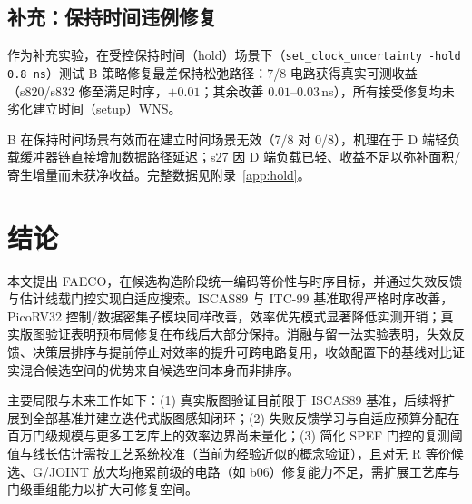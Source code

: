 \documentclass[journal]{IEEEtran}
\begin{document}
\subsection{补充：保持时间违例修复}\label{sec:hold}

作为补充实验，在受控保持时间（hold）场景下（\texttt{set\_clock\_uncertainty -hold 0.8\,ns}）测试 B 策略修复最差保持松弛路径：7/8 电路获得真实可测收益（s820/s832 修至满足时序，$+0.01$；其余改善 $0.01$--$0.03\,$ns），所有接受修复均未劣化建立时间（setup）WNS。

B 在保持时间场景有效而在建立时间场景无效（7/8 对 0/8），机理在于 D 端轻负载缓冲器链直接增加数据路径延迟；s27 因 D 端负载已轻、收益不足以弥补面积/寄生增量而未获净收益。完整数据见附录~\ref{app:hold}。

\section{结论}\label{sec:conclusion}

本文提出 FAECO，在候选构造阶段统一编码等价性与时序目标，并通过失效反馈与估计线载门控实现自适应搜索。ISCAS89 与 ITC-99 基准取得严格时序改善，PicoRV32 控制/数据密集子模块同样改善，效率优先模式显著降低实测开销；真实版图验证表明预布局修复在布线后大部分保持。消融与留一法实验表明，失效反馈、决策层排序与提前停止对效率的提升可跨电路复用，收敛配置下的基线对比证实混合候选空间的优势来自候选空间本身而非排序。

主要局限与未来工作如下：(1) 真实版图验证目前限于 ISCAS89 基准，后续将扩展到全部基准并建立迭代式版图感知闭环；(2) 失败反馈学习与自适应预算分配在百万门级规模与更多工艺库上的效率边界尚未量化；(3) 简化 SPEF 门控的复测阈值与线长估计需按工艺系统校准（当前为经验近似的概念验证），且对无 R 等价候选、G/JOINT 放大均拖累前级的电路（如 b06）修复能力不足，需扩展工艺库与门级重组能力以扩大可修复空间。
\end{document}
